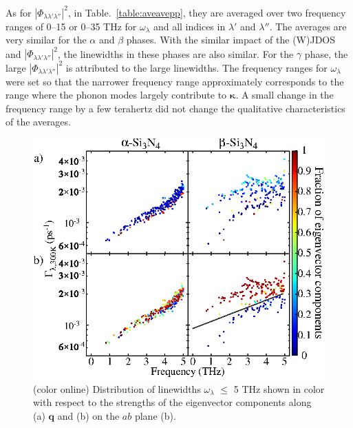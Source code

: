 \documentclass[twocolumn,amsmath,amssymb,a4paper,prb,superscriptaddress,floatfix]{revtex4-1}
\begin{document}
As for $|\Phi_{\lambda\lambda'\lambda''}|^2$, in Table.~\ref{table:aveavepp},
they are averaged over two frequency ranges of 0--15 or 0--35 THz for
$\omega_\lambda$ and all indices in $\lambda'$ and $\lambda''$. The averages
are very similar for the $\alpha$ and $\beta$ phases. With the
similar impact of the (W)JDOS and $|\Phi_{\lambda\lambda'\lambda''}|^2$, the
linewidths in these phases are also similar. For the $\gamma$ phase, the large
$|\Phi_{\lambda\lambda'\lambda''}|^2$ is attributed to the large linewidths. 
The frequency ranges for $\omega_\lambda$ were set so that the narrower frequency range
approximately corresponds to the range where the phonon modes largely contribute
to $\boldsymbol{\kappa}$. A small change in the frequency range by a few
terahertz did not change the qualitative characteristics of the averages.  

\begin{figure}[ht]
 \centering
  \includegraphics[width=\linewidth]{figure_analyze_gamma3_m1010_print.eps} \caption{(color
	  online) Distribution of linewidths $\omega_\lambda$ $\leq$ 5 THz
		  shown in color with respect to the strengths of the eigenvector
		  components along (a) $\mathbf q$ 
	  and (b) on the $ab$ plane (b).} \label{fig:Fig7_338} 
 \centering
\end{figure}
\end{document}
